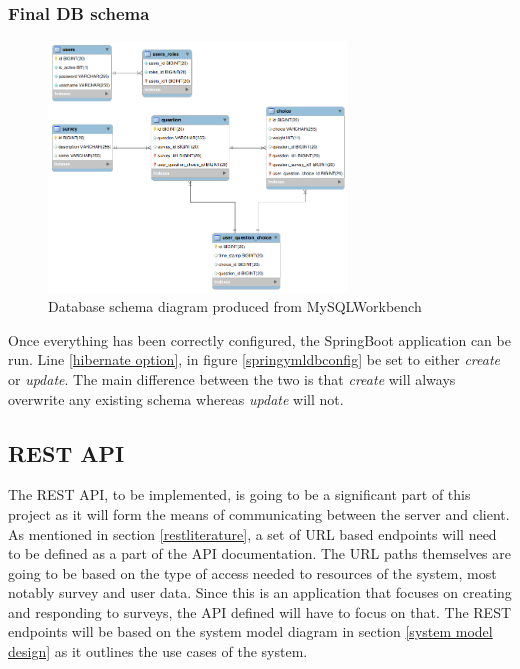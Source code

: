 \clearpage
\subsubsection{Final DB schema}

\begin{figure}[ht]
    \centering
    \includegraphics[width=300px]{images/db_schema.png}
    \caption{Database schema diagram produced from MySQLWorkbench}
    \label{sqldbschamfull}
\end{figure}

Once everything has been correctly configured, the SpringBoot application can be run.
Line \ref{hibernate option}, in figure \ref{springymldbconfig} be set to either \textit{create} or \textit{update}.
The main difference between the two is that \textit{create} will always overwrite any existing schema whereas \textit{update} will not.



\subsection{REST API}

The REST API, to be implemented, is going to be a significant part of this project as it will form the means of communicating between
the server and client. 
As mentioned in section \ref{restliterature}, a set of URL based endpoints will need to be defined as a part of the API 
documentation.
The URL paths themselves are going to be based on the type of access needed to resources of the system, most notably survey and user data.
Since this is an application that focuses on creating and responding to surveys, the API defined will have to focus on that.
The REST endpoints will be based on the system model diagram in section \ref{system model design} as it outlines the use cases 
of the system.

